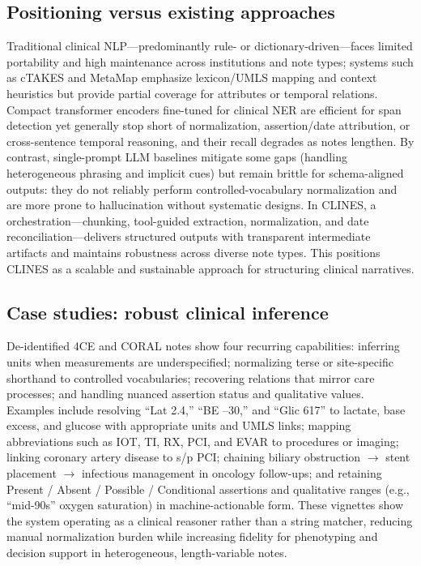 \subsection{Positioning versus existing approaches}

Traditional clinical NLP—predominantly rule- or dictionary-driven—faces limited portability and high maintenance across institutions and note types; systems such as cTAKES and MetaMap emphasize lexicon/UMLS mapping and context heuristics but provide partial coverage for attributes or temporal relations. Compact transformer encoders fine-tuned for clinical NER are efficient for span detection yet generally stop short of normalization, assertion/date attribution, or cross-sentence temporal reasoning, and their recall degrades as notes lengthen. By contrast, single-prompt LLM baselines mitigate some gaps (handling heterogeneous phrasing and implicit cues) but remain brittle for schema-aligned outputs: they do not reliably perform controlled-vocabulary normalization and are more prone to hallucination without systematic designs. In CLINES, a  orchestration—chunking, tool-guided extraction, normalization, and date reconciliation—delivers structured outputs with transparent intermediate artifacts and maintains robustness across diverse note types. This positions CLINES as a scalable and sustainable approach for structuring clinical narratives. 

\subsection{Case studies: robust clinical inference}

De-identified 4CE and CORAL notes show four recurring capabilities: inferring units when measurements are underspecified; normalizing terse or site-specific shorthand to controlled vocabularies; recovering relations that mirror care processes; and handling nuanced assertion status and qualitative values. Examples include resolving ``Lat 2.4,'' ``BE --30,'' and ``Glic 617'' to lactate, base excess, and glucose with appropriate units and UMLS links; mapping abbreviations such as IOT, TI, RX, PCI, and EVAR to procedures or imaging; linking coronary artery disease to s/p PCI; chaining biliary obstruction $\rightarrow$ stent placement $\rightarrow$ infectious management in oncology follow-ups; and retaining Present / Absent / Possible / Conditional assertions and qualitative ranges (e.g., ``mid-90s'' oxygen saturation) in machine-actionable form. These vignettes show the system operating as a clinical reasoner rather than a string matcher, reducing manual normalization burden while increasing fidelity for phenotyping and decision support in heterogeneous, length-variable notes.

